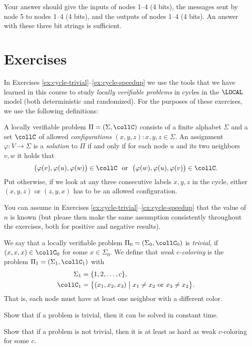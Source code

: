 Your answer should give the inputs of nodes 1--4 (4 bits), the messages sent by node 5 to nodes 1--4 (4 bits), and the outputs of nodes 1--4 (4 bits). An answer with these three bit strings is sufficient.

\section{Exercises}

In Exercises \ref{ex:cycle-trivial}--\ref{ex:cycle-speedup} we use the tools that we have learned in this course to study \emph{locally verifiable problems} in cycles in the $\LOCAL$ model (both deterministic and randomized). For the purposes of these exercises, we use the following definitions:

A locally verifiable problem $\Pi = (\Sigma, \collC)$ consists of a finite alphabet $\Sigma$ and a set $\collC$ of allowed \emph{configurations} $(x,y,z) \colon x,y,z \in \Sigma$. An assignment $\varphi \colon V \to \Sigma$ is a \emph{solution} to $\Pi$ if and only if for each node $u$ and its two neighbors $v, w$ it holds that
\[
  \bigl(\varphi(v), \varphi(u), \varphi(w)\bigr) \in \collC\ \ \text{or}\ \ \bigl(\varphi(w), \varphi(u), \varphi(v)\bigr) \in \collC.
\]
Put otherwise, if we look at any three consecutive labels $x,y,z$ in the cycle, either $(x,y,z)$ or $(z,y,x)$ has to be an allowed configuration.

You can assume in Exercises \ref{ex:cycle-trivial}--\ref{ex:cycle-speedup} that the value of $n$ is known (but please then make the same assumption consistently throughout the exercises, both for positive and negative results).

\begin{ex} \label{ex:cycle-trivial}
  We say that a locally verifiable problem $\Pi_0 = (\Sigma_0, \collC_0)$ is \emph{trivial}, if $(x,x,x) \in \collC_0$ for some $x \in \Sigma_0$. 
  We define that \emph{weak $c$-coloring} is the problem $\Pi_1 = (\Sigma_1, \collC_1)$ with
  \begin{align*}
    \Sigma_1 &= \{1,2,\dots,c\}, \\
    \collC_1 &= \bigl\{ (x_1, x_2, x_3) \bigm| x_1 \neq x_2 \text{ or } x_3 \neq x_2 \bigr\}.
  \end{align*}
  That is, each node must have at least one neighbor with a different color.
  \begin{subex}
    \item Show that if a problem is trivial, then it can be solved in constant time.
    \item Show that if a problem is not trivial, then it is at least as hard as weak $c$-coloring for some $c$. 
  \end{subex}
\end{ex}

